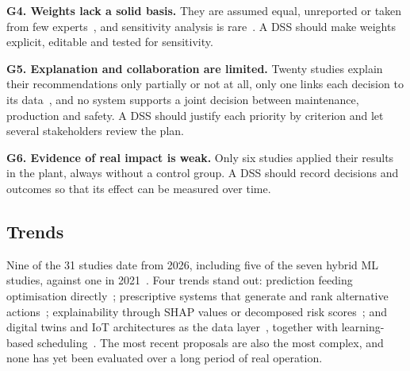 \textbf{G4. Weights lack a solid basis.} They are assumed equal, unreported or taken from few experts~\cite{delgado2026,wittbrodt2026,ozcan2021}, and sensitivity analysis is rare~\cite{bahrami2021,rios2025,wehbi2026,darko2026}. A DSS should make weights explicit, editable and tested for sensitivity.

\textbf{G5. Explanation and collaboration are limited.} Twenty studies explain their recommendations only partially or not at all, only one links each decision to its data~\cite{danach2026}, and no system supports a joint decision between maintenance, production and safety. A DSS should justify each priority by criterion and let several stakeholders review the plan.

\textbf{G6. Evidence of real impact is weak.} Only six studies applied their results in the plant, always without a control group. A DSS should record decisions and outcomes so that its effect can be measured over time.

\subsection{Trends}
\label{sec:trends}

Nine of the 31 studies date from 2026, including five of the seven hybrid ML studies, against one in 2021~\cite{astepe2021}. Four trends stand out: prediction feeding optimisation directly~\cite{danach2026,darko2026,wehbi2026,dui2025}; prescriptive systems that generate and rank alternative actions~\cite{wittbrodt2026}; explainability through SHAP values or decomposed risk scores~\cite{danach2026,tang2026}; and digital twins and IoT architectures as the data layer~\cite{dui2025,dui2026}, together with learning-based scheduling~\cite{li2027}. The most recent proposals are also the most complex, and none has yet been evaluated over a long period of real operation.